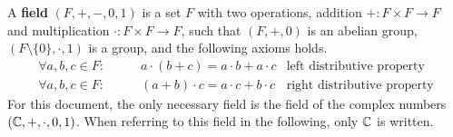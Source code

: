 A \textbf{field} $(F, +, -, 0, 1)$ is a set $F$ with two operations, addition $+: F \times F \to F$ and multiplication $\cdot: F \times F \to F$, such that $(F, +, 0)$ is an abelian group, $(F \setminus \{0\}, \cdot, 1)$ is a group, and the following axioms holds.
\begin{subequations}
\begin{align}
    \forall a, b, c \in F: \qquad & a \cdot (b + c) = a \cdot b + a \cdot c & \text{left distributive property} \\
    \forall a, b, c \in F: \qquad & (a + b) \cdot c = a \cdot c + b \cdot c & \text{right distributive property}
\end{align}
\end{subequations}
For this document, the only necessary field is the field of the complex numbers $(\mathbb{C}, +, \cdot, 0, 1)$.
When referring to this field in the following, only $\mathbb{C}$ is written.
